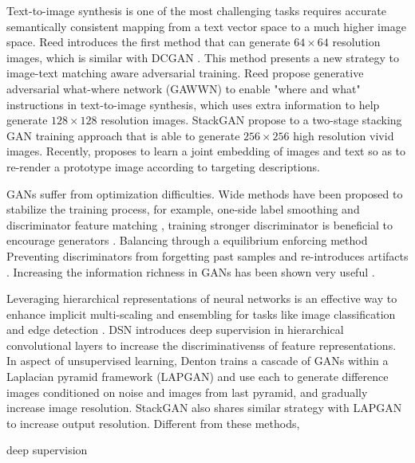 \documentclass[10pt,twocolumn,letterpaper]{article}
\begin{document}
Text-to-image synthesis is one of the most challenging tasks requires accurate semantically consistent mapping from a text vector space to a much higher image space.  Reed \etal \cite{reed2016generative} introduces the first method that can generate $64{\times}64$ resolution images, which is similar with DCGAN \cite{}. This method presents a new strategy to image-text matching aware adversarial training. Reed \etal \cite{reed2016learning} propose  generative
adversarial what-where network (GAWWN) to enable "where and what" instructions in text-to-image synthesis, which uses extra information to help generate $128{\times}128$ resolution images. StackGAN \etal \cite{han2017stackgan} propose to a two-stage stacking GAN training approach that is able to generate $256{\times}256$ high resolution vivid images. Recently, \cite{dong2017semantic} proposes to learn a joint embedding of images and text so as to re-render a prototype image according to targeting descriptions. 	
	
GANs suffer from optimization difficulties. Wide methods have been proposed to stabilize the training process, for example, one-side label smoothing and discriminator feature matching \cite{salimans2016improved}, training stronger discriminator is beneficial to encourage generators \cite{arjovsky2017wasserstein}. Balancing through a equilibrium enforcing method \cite{berthelot2017began}
Preventing discriminators from forgetting past samples and re-introduces artifacts \cite{shrivastava2016learning}. Increasing the information richness in GANs has been shown very useful \cite{odena2016conditional}. 

Leveraging hierarchical representations of neural networks is an effective way to enhance implicit multi-scaling and ensembling for tasks like image classification \cite{lee2015deeply} and edge detection \cite{xie2015holistically}. DSN \cite{lee2015deeply} introduces deep supervision in hierarchical convolutional layers to increase the discriminativenss of feature representations. In aspect of unsupervised learning, Denton \etal \cite{denton2015deep} trains a cascade of GANs within a Laplacian pyramid framework (LAPGAN) and use each to generate difference images conditioned on noise and images from last pyramid, and gradually increase image resolution. StackGAN also shares similar strategy with LAPGAN to increase output resolution. Different from these methods, 
 

deep supervision 
\end{document}
